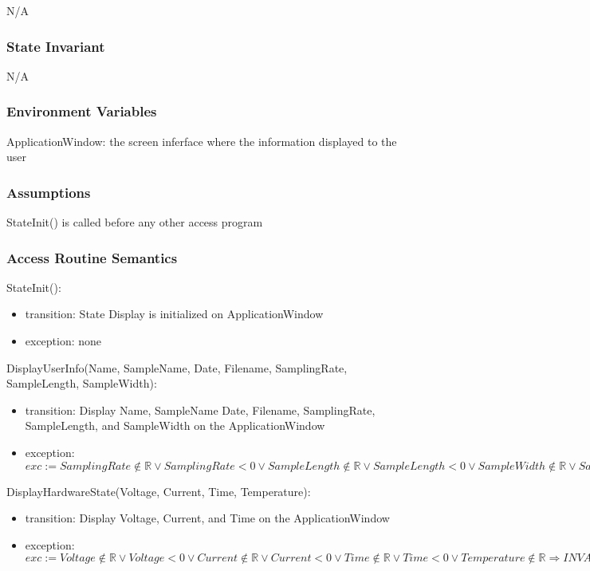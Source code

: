 \documentclass[12pt, titlepage]{article}
\begin{document}
N/A

\subsubsection{State Invariant}

N/A

\subsubsection{Environment Variables}

ApplicationWindow: the screen inferface where the information displayed to the user

\subsubsection{Assumptions}

StateInit() is called before any other access program

\subsubsection{Access Routine Semantics}

\noindent StateInit():
\begin{itemize}
\item transition: State Display is initialized on ApplicationWindow
\item exception: none
\end{itemize}

\noindent DisplayUserInfo(Name, SampleName, Date, Filename, SamplingRate, SampleLength, SampleWidth):
\begin{itemize}
\item transition: Display Name, SampleName Date, Filename, SamplingRate, SampleLength, and SampleWidth on the ApplicationWindow
\item exception: $exc:= SamplingRate \notin \mathbb{R} \lor SamplingRate < 0 \lor SampleLength \notin \mathbb{R} \lor SampleLength < 0 \lor SampleWidth \notin \mathbb{R} \lor SampleWidth < 0 \Rightarrow INVALID$
\end{itemize}

\noindent DisplayHardwareState(Voltage, Current, Time, Temperature):
\begin{itemize}
\item transition: Display Voltage, Current, and Time on the ApplicationWindow
\item exception: $exc:= Voltage \notin  \mathbb{R} \lor Voltage < 0 \lor  Current \notin  \mathbb{R} \lor Current < 0 \lor  Time \notin  \mathbb{R} \lor Time < 0 \lor  Temperature \notin  \mathbb{R} \Rightarrow INVALID$
\end{itemize}
\end{document}
